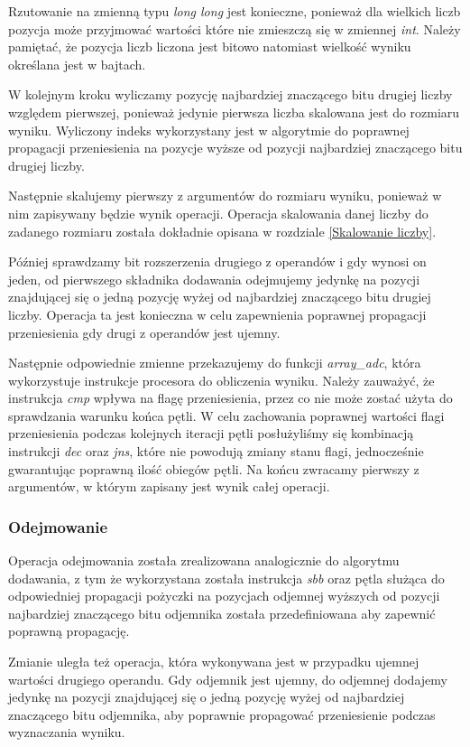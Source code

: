 \documentclass{article}
\begin{document}
Rzutowanie na zmienną typu \textit{long long} jest konieczne, ponieważ dla wielkich liczb pozycja może przyjmować wartości które nie zmieszczą się w zmiennej \textit{int}. Należy pamiętać, że pozycja liczb liczona jest bitowo natomiast wielkość wyniku określana jest w bajtach.

W kolejnym kroku wyliczamy pozycję najbardziej znaczącego bitu drugiej liczby względem pierwszej, ponieważ jedynie pierwsza liczba skalowana jest do rozmiaru wyniku. Wyliczony indeks wykorzystany jest w algorytmie do poprawnej propagacji przeniesienia na pozycje wyższe od pozycji najbardziej znaczącego bitu drugiej liczby.

Następnie skalujemy pierwszy z argumentów do rozmiaru wyniku, ponieważ w nim zapisywany będzie wynik operacji. Operacja skalowania danej liczby do zadanego rozmiaru została dokładnie opisana w rozdziale \ref{Skalowanie liczby}.

Później sprawdzamy bit rozszerzenia drugiego z operandów i gdy wynosi on jeden, od pierwszego składnika dodawania odejmujemy jedynkę na pozycji znajdującej się o jedną pozycję wyżej od najbardziej znaczącego bitu drugiej liczby. Operacja ta jest konieczna w celu zapewnienia poprawnej propagacji przeniesienia gdy drugi z operandów jest ujemny.

Następnie odpowiednie zmienne przekazujemy do funkcji \textit{array\_adc}, która wykorzystuje instrukcje procesora do obliczenia wyniku. Należy zauważyć, że instrukcja \textit{cmp} wpływa na flagę przeniesienia, przez co nie może zostać użyta do sprawdzania warunku końca pętli. W celu zachowania poprawnej wartości flagi przeniesienia podczas kolejnych iteracji pętli posłużyliśmy się kombinacją instrukcji \textit{dec} oraz \textit{jns}, które nie powodują zmiany stanu flagi, jednocześnie gwarantując poprawną ilość obiegów pętli. Na końcu zwracamy pierwszy z argumentów, w którym zapisany jest wynik całej operacji.

\subsubsection{Odejmowanie}

Operacja odejmowania została zrealizowana analogicznie do algorytmu dodawania, z tym że wykorzystana została instrukcja \textit{sbb} oraz pętla służąca do odpowiedniej propagacji pożyczki na pozycjach odjemnej wyższych od pozycji najbardziej znaczącego bitu odjemnika została przedefiniowana aby zapewnić poprawną propagację.

Zmianie uległa też operacja, która wykonywana jest w przypadku ujemnej wartości drugiego operandu. Gdy odjemnik jest ujemny, do odjemnej dodajemy jedynkę na pozycji znajdującej się o jedną pozycję wyżej od najbardziej znaczącego bitu odjemnika, aby poprawnie propagować przeniesienie podczas wyznaczania wyniku.
\end{document}
